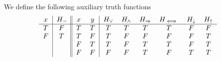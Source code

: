 \begin{definition}\label{def:truth_functions}
  We define the following auxiliary truth functions
  \begin{equation*}
    \begin{tabular}{c | c || c c | c c c c c c}
      \( x \)    & \( H_\neg \) & \( x \)    & \( y \)    & \( H_\vee \) & \( H_\wedge \) & \( H_\Rightarrow \) & \( H_{\iff} \) & \( H_\downarrow \) & \( H_\uparrow \) \\
      \hline
      \( T \)    & \( F \)      & \( T \)    & \( T \)    & \( T \)      & \( T \)       & \( T \)          & \( T \)      & \( F \)            & \( F \)    \\
      \( F \)    & \( T \)      & \( T \)    & \( F \)    & \( T \)      & \( F \)       & \( F \)          & \( F \)      & \( F \)            & \( T \)    \\
             &          & \( F \)    & \( T \)    & \( T \)      & \( F \)       & \( T \)          & \( T \)      & \( F \)            & \( T \)    \\
             &          & \( F \)    & \( F \)    & \( F \)      & \( F \)       & \( T \)          & \( F \)      & \( T \)            & \( T \)
    \end{tabular}
  \end{equation*}
\end{definition}

